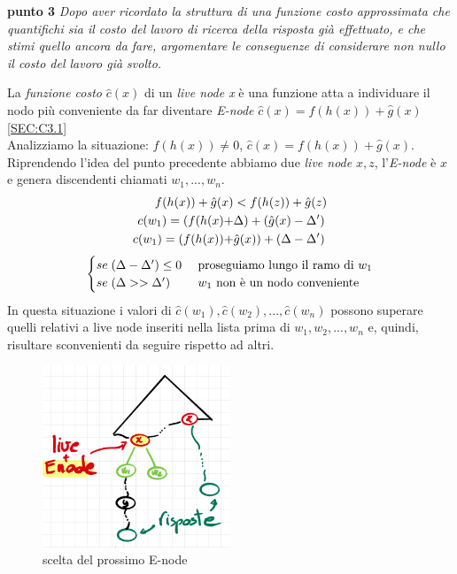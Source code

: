 \documentclass[a4paper]{article}
\begin{document}
\textbf{punto 3}
\emph{Dopo aver ricordato la struttura di una funzione costo approssimata che quantifichi sia il costo del lavoro di ricerca della risposta già effettuato, e che stimi quello ancora da fare, argomentare le conseguenze di considerare non nullo il costo del lavoro già svolto.}
\begin{adjustwidth}{.8cm}{0cm}
	La \textit{funzione costo} $\hat c(x)$ di un \textit{live node x} è una funzione atta a individuare il nodo più conveniente da far diventare \textit{E-node} $\hat c(x) = f(h(x)) + \hat g(x)$ \ref{SEC:C3.1}\\
Analizziamo la situazione: $f(h(x)) \neq 0$, $\hat c(x) = f(h(x)) + \hat g(x)$.\\
Riprendendo l'idea del punto precedente abbiamo due \textit{live node} $x,z$, l'\textit{E-node} è $x$ e genera discendenti chiamati $w_1,..., w_n$.
\begin{align}        
	f(h(x)) + \hat g(x) &< f(h(z)) + \hat g(z) \notag \\
	c(w_1) = (f(h(x) + &\Delta) + (\hat g(x) - \Delta') \notag \\
	c(w_1) = (f(h(x)) + &\hat g(x)) + (\Delta - \Delta') \notag
	\end{align}
	\begin{equation}
	\begin{cases}
		se \; (\Delta - \Delta') \leq 0 &\text{ proseguiamo lungo il ramo di $w_1$} \notag \\
		se \; (\Delta >> \Delta') &\text{ $w_1$ non è un nodo conveniente} \notag
	\end{cases}
	\end{equation}
In questa situazione i valori di $\hat c(w_1), \hat c(w_2), . . . , \hat c(w_n)$ possono superare quelli relativi a live node inseriti nella lista prima di $w_1, w_2, . . . , w_n$ e, quindi, risultare sconvenienti da seguire rispetto ad altri.\\
\begin{figure}[!ht]
\centering
\includegraphics[width=0.5\textwidth]{./img/C3_next.png}
\caption{scelta del prossimo E-node} \label{FIG:C3_next2}
\end{figure}\\
\end{adjustwidth}
\end{document}
